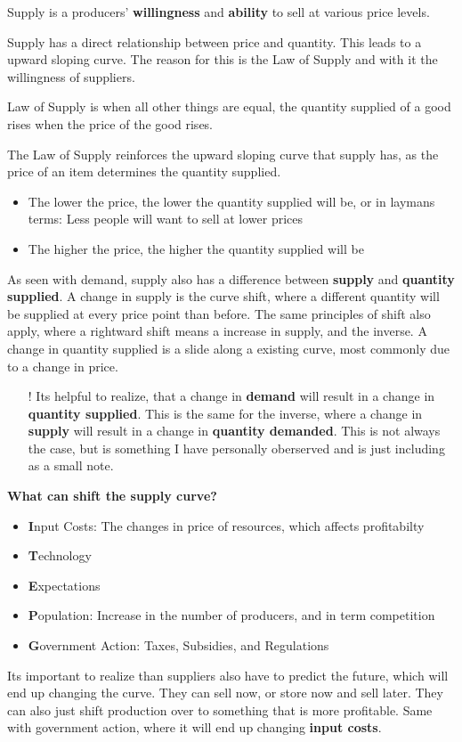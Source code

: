 \begin{definition}
    Supply is a producers' \textbf{willingness} and \textbf{ability} to sell at various price levels. 
\end{definition}
 Supply has a direct relationship between price and quantity. This leads to a upward sloping curve. The reason for this is the Law of Supply and with it the willingness of suppliers. 
 \begin{definition}
     Law of Supply is when all other things are equal, the quantity supplied of a good rises when the price of the good rises. 
 \end{definition}
 The Law of Supply reinforces the upward sloping curve that supply has, as the price of an item determines the quantity supplied. 
 \begin{itemize}
     \item The lower the price, the lower the quantity supplied will be, or in laymans terms: Less people will want to sell at lower prices
     \item The higher the price, the higher the quantity supplied will be
 \end{itemize}
As seen with demand, supply also has a difference between \textbf{supply} and \textbf{quantity supplied}. A change in supply is the curve shift, where a different quantity will be supplied at every price point than before. The same principles of shift also apply, where a rightward shift means a increase in supply, and the inverse. A change in quantity supplied is a slide along a existing curve, most commonly due to a change in price.
\begin{itemize}
    \item[!] Its helpful to realize, that a change in \textbf{demand} will result in a change in \textbf{quantity supplied}. This is the same for the inverse, where a change in \textbf{supply} will result in a change in \textbf{quantity demanded}. This is not always the case, but is something I have personally oberserved and is just including as a small note.
\end{itemize}
\textbf{What can shift the supply curve?}
\begin{itemize}
    \item \textbf{I}nput Costs: The changes in price of resources, which affects profitabilty
    \item \textbf{T}echnology
    \item \textbf{E}xpectations
    \item \textbf{P}opulation: Increase in the number of producers, and in term competition
    \item \textbf{G}overnment Action: Taxes, Subsidies, and Regulations
\end{itemize}
Its important to realize than suppliers also have to predict the future, which will end up changing the curve. They can sell now, or store now and sell later. They can also just shift production over to something that is more profitable. Same with government action, where it will end up changing \textbf{input costs}.

